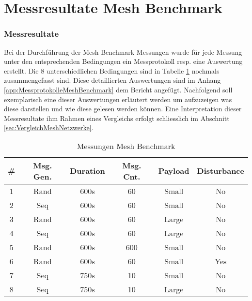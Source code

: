 \vspace*{4cm}
\part{Messresultate Mesh Benchmark}\label{part:MessresultateMeshBenchmark}
\vspace*{\fill}
\clearpage

\section{Messresultate}\label{sec:Messresultate}
Bei der Durchführung der Mesh Benchmark Messungen wurde für jede Messung unter den entsprechenden Bedingungen ein Messprotokoll resp. eine Auswertung erstellt. Die 8 unterschiedlichen Bedingungen sind in Tabelle \ref{tab:MessungenMeshBenchmark} nochmals zusammengefasst sind.
Diese detaillierten Auswertungen sind im Anhang \ref{app:MessprotokolleMeshBenchmark} dem Bericht angefügt.
Nachfolgend soll exemplarisch eine dieser Auswertungen erläutert werden um aufzuzeigen was diese darstellen und wie diese gelesen werden können.
Eine Interpretation dieser Messresultate ihm Rahmen eines Vergleichs erfolgt schliesslich im Abschnitt \ref{sec:VergleichMeshNetzwerke}.

\begin{table}[h]
\centering
\begin{tabular}{|c|c|c|c|c|c|} 
\hline
\textbf{\#}  & \textbf{Msg. Gen.}  & \textbf{Duration}  & \textbf{Msg. Cnt.}  & \textbf{Payload }  & \textbf{Disturbance}  \\ 
\hline
1 & Rand & 600s & 60 & Small & No \\ 
\hline
2 & Seq & 600s & 60 & Small & No \\ 
\hline
3 & Rand & 600s & 60 & Large & No \\ 
\hline
4 & Seq & 600s & 60 & Large & No \\ 
\hline
5 & Rand & 600s & 600 & Small & No \\ 
\hline
6 & Rand & 600s & 60 & Small & Yes \\ 
\hline
7 & Seq & 750s & 10 & Small & No \\ 
\hline
8 & Seq & 750s & 10 & Large & No \\
\hline
\end{tabular}
\caption{Messungen Mesh Benchmark}
\label{tab:MessungenMeshBenchmark}
\end{table}


